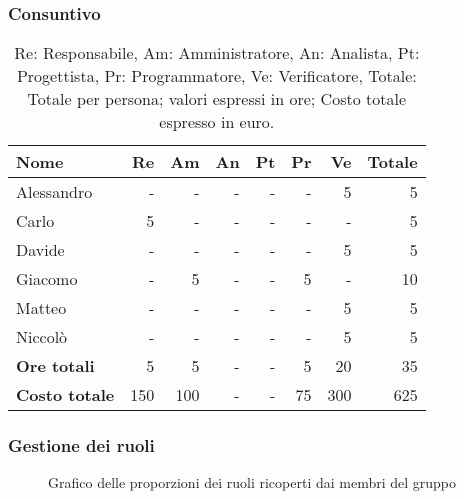 \subsubsection{Consuntivo}
\begin{table}[H]
	\centering
	\begin{tabular}{l|r|r|r|r|r|r|r}
		\textbf{Nome}         & \textbf{Re} & \textbf{Am} & \textbf{An} & \textbf{Pt} & \textbf{Pr} & \textbf{Ve} & \textbf{Totale} \\
		\hline
		Alessandro            & -           & -           & -           & -           & -           & 5           & 5               \\
		Carlo                 & 5           & -           & -           & -           & -           & -           & 5               \\
		Davide                & -           & -           & -           & -           & -           & 5           & 5               \\
		Giacomo               & -           & 5           & -           & -           & 5           & -           & 10              \\
		Matteo                & -           & -           & -           & -           & -           & 5           & 5               \\
		Niccolò               & -           & -           & -           & -           & -           & 5           & 5               \\
		\hline
		\textbf{Ore totali}   & 5           & 5           & -           & -           & 5           & 20          & 35              \\
		\textbf{Costo totale} & 150         & 100         & -           & -           & 75          & 300         & 625
	\end{tabular}
	\caption{Re: Responsabile, Am: Amministratore, An: Analista, Pt: Progettista,
		Pr: Programmatore, Ve: Verificatore, Totale: Totale per persona; valori espressi in ore; Costo totale espresso in euro.}
\end{table}

\subsubsection{Gestione dei ruoli}
\begin{figure}[h]
	\centering
	\caption{Grafico delle proporzioni dei ruoli ricoperti dai membri del gruppo}
\end{figure}

